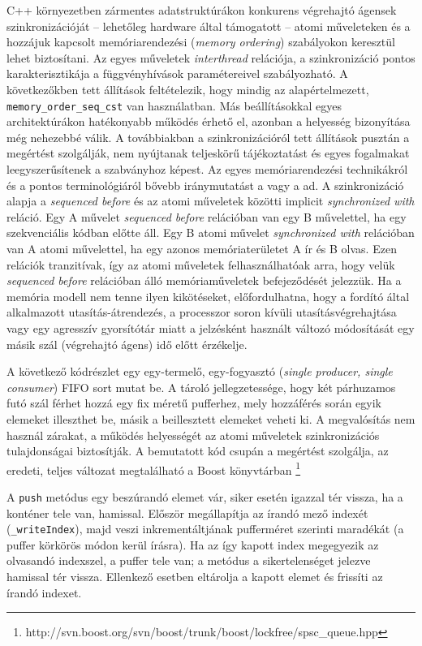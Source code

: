     C++ környezetben zármentes adatstruktúrákon konkurens végrehajtó ágensek szinkronizációját -- lehetőleg hardware által támogatott -- atomi műveleteken és a hozzájuk kapcsolt memóriarendezési (\emph{memory ordering}) szabályokon keresztül lehet biztosítani. Az egyes műveletek \emph{interthread} relációja, a szinkronizáció pontos karakterisztikája a függvényhívások paramétereivel szabályozható. A következőkben tett állítások feltételezik, hogy mindig az alapértelmezett, \texttt{memory\_order\_seq\_cst} van használatban. Más beállításokkal egyes architektúrákon hatékonyabb működés érhető el, azonban a helyesség bizonyítása még nehezebbé válik. A továbbiakban a szinkronizációról tett állítások pusztán a megértést szolgálják, nem nyújtanak teljeskörű tájékoztatást és egyes fogalmakat leegyszerűsítenek a szabványhoz képest. Az egyes memóriarendezési technikákról és a pontos terminológiáról bővebb iránymutatást a \cite{ConcurrencyInAction} vagy a \cite{C++11/MemoryModel} ad. A szinkronizáció alapja a \emph{sequenced before} és az atomi műveletek közötti implicit \emph{synchronized with} reláció. Egy A művelet \emph{sequenced before} relációban van egy B művelettel, ha egy szekvenciális kódban előtte áll. Egy B atomi művelet \emph{synchronized with} relációban van A atomi művelettel, ha egy azonos memóriaterületet A ír és B olvas. Ezen relációk tranzitívak, így az atomi műveletek felhasználhatóak arra, hogy velük \emph{sequenced before} relációban álló memóriaműveletek befejeződését jelezzük. Ha a memória modell nem tenne ilyen kikötéseket, előfordulhatna, hogy a fordító által alkalmazott utasítás-átrendezés, a processzor soron kívüli utasításvégrehajtása vagy egy agresszív gyorsítótár miatt a jelzésként használt változó módosítását egy másik szál (végrehajtó ágens) idő előtt érzékelje.
    
    A következő kódrészlet egy egy-termelő, egy-fogyasztó (\emph{single producer, single consumer}) FIFO sort mutat be. A tároló jellegzetessége, hogy két párhuzamos futó szál férhet hozzá egy fix méretű pufferhez, mely hozzáférés során egyik elemeket illeszthet be, másik a beillesztett elemeket veheti ki. A megvalósítás nem használ zárakat, a működés helyességét az atomi műveletek szinkronizációs tulajdonságai biztosítják. A bemutatott kód csupán a megértést szolgálja, az eredeti, teljes változat megtalálható a Boost könyvtárban \footnote{http://svn.boost.org/svn/boost/trunk/boost/lockfree/spsc\_queue.hpp}
    
%    
    A \texttt{push} metódus egy beszúrandó elemet vár, siker esetén igazzal tér vissza, ha a konténer tele van, hamissal. Először megállapítja az írandó mező indexét (\texttt{\_writeIndex}), majd veszi inkrementáltjának pufferméret szerinti maradékát (a puffer körkörös módon kerül írásra). Ha az így kapott index megegyezik az olvasandó indexszel, a puffer tele van; a metódus a sikertelenséget jelezve hamissal tér vissza. Ellenkező esetben eltárolja a kapott elemet és frissíti az írandó indexet. 
    

